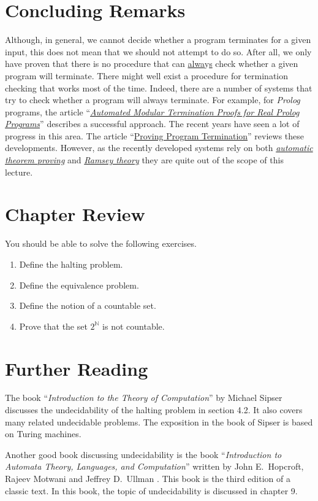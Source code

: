 \section{Concluding Remarks}
Although, in general, we cannot decide whether a program terminates for a given input, this does not mean
that we should not attempt to do so.  After all, we only have proven that there is no procedure that
can \underline{alwa}y\underline{s} check whether a given program will terminate.  There might well exist a
procedure for termination checking that works most of the time.  Indeed, there are a number of
systems that try to check whether a program will always terminate.  For example, for \textsl{Prolog}
programs, the article 
``\href{http://link.springer.com/chapter/10.1007%2F3-540-61739-6_44}{\emph{Automated Modular Termination Proofs for Real Prolog Programs}}''
\cite{mueller:1996} describes a successful approach.  The recent years have seen a lot of progress in
this area.  The article 
``\href{http://dl.acm.org/citation.cfm?id=1941509}{{Proving Program Termination}}''
\cite{cook:2011} reviews these developments.  However, as the recently developed systems rely on both
\href{http://en.wikipedia.org/wiki/Automated_theorem_proving}{\emph{automatic theorem proving}} and
\href{http://en.wikipedia.org/wiki/Ramsey_theory}{\emph{Ramsey theory}} they are quite out of the
scope of this lecture.

\section{Chapter Review}
You should be able to solve the following exercises.
\begin{enumerate}
\item Define the halting problem.
\item Define the equivalence problem.
\item Define the notion of a countable set.
\item Prove that the set $2^{\mathbb{N}}$ is not countable.
\end{enumerate}


\section{Further Reading}
The book ``\emph{Introduction to the Theory of Computation}'' by Michael Sipser \cite{sipser:1996}
discusses the undecidability of the halting problem in section 4.2.  It also covers many related
undecidable problems.  The exposition in the book of Sipser is based on Turing machines.  

Another good book discussing undecidability is the book 
``\emph{Introduction to Automata Theory, Languages, and Computation}'' written by John E.~Hopcroft,
Rajeev Motwani and Jeffrey D.~Ullman \cite{hopcroft:06}.  This book is the third edition of a
classic text.  In this book, the topic of undecidability is discussed in chapter 9.



